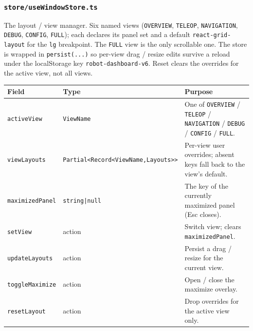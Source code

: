 \subsubsection{\texttt{store/useWindowStore.ts}}

The layout / view manager. Six named views (\texttt{OVERVIEW},
\texttt{TELEOP}, \texttt{NAVIGATION}, \texttt{DEBUG}, \texttt{CONFIG},
\texttt{FULL}); each declares its panel set and a default
\texttt{react-grid-layout} for the \texttt{lg} breakpoint. The
\texttt{FULL} view is the only scrollable one. The store is wrapped in
\texttt{persist(...)} so per-view drag / resize edits survive a reload
under the localStorage key \texttt{robot-dashboard-v6}. Reset clears the
overrides for the active view, not all views.

\begin{center}
\begin{tabular}{|p{3.4cm}|p{4.3cm}|p{6.6cm}|}
\hline
\textbf{Field}              & \textbf{Type}                                  & \textbf{Purpose}                                                  \\
\hline
\texttt{activeView}         & \texttt{ViewName}                              & One of \texttt{OVERVIEW} / \texttt{TELEOP} / \texttt{NAVIGATION} / \texttt{DEBUG} / \texttt{CONFIG} / \texttt{FULL}. \\
\texttt{viewLayouts}        & \texttt{Partial<Record<ViewName,Layouts>>}     & Per-view user overrides; absent keys fall back to the view's default. \\
\texttt{maximizedPanel}     & \texttt{string|null}                           & The key of the currently maximized panel (Esc closes).            \\
\texttt{setView}            & action                                         & Switch view; clears \texttt{maximizedPanel}.                      \\
\texttt{updateLayouts}      & action                                         & Persist a drag / resize for the current view.                     \\
\texttt{toggleMaximize}     & action                                         & Open / close the maximize overlay.                                \\
\texttt{resetLayout}        & action                                         & Drop overrides for the active view only.                          \\
\hline
\end{tabular}
\end{center}

